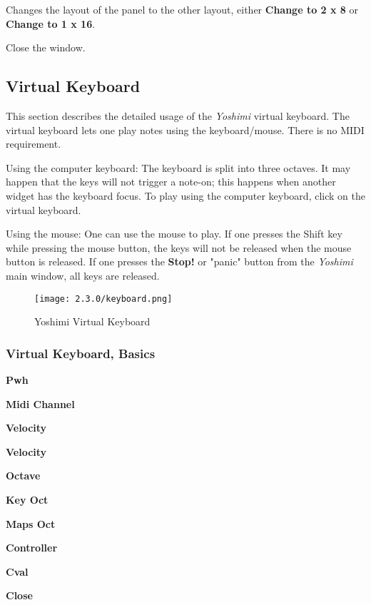    Changes the layout of the panel to the other layout, either
   \textbf{Change to 2 x 8} or
   \textbf{Change to 1 x 16}.

   Close the window.

\subsection{Virtual Keyboard}
\label{subsec:virtual_keyboard}

   This section describes the detailed usage of the
   \textsl{Yoshimi} virtual keyboard.
   The virtual keyboard lets one play notes using the keyboard/mouse. There is
   no MIDI requirement.

   Using the computer keyboard: The keyboard is split into three octaves.
   It may happen that the keys will not trigger a note-on;
   this happens when another widget has the keyboard focus.
   To play using the computer keyboard, click on the virtual keyboard.

   Using the mouse: One can use the mouse to play.  If one presses the
   Shift key while pressing the mouse button, the keys will not be released
   when the mouse button is released.  If one presses the \textbf{Stop!} or
   "panic" button from the \textsl{Yoshimi} main window,
   all keys are released.

\begin{figure}[H]
   \centering
   \texttt{[image: 2.3.0/keyboard.png]}
   \caption{Yoshimi Virtual Keyboard}
   \label{fig:yoshimi_virtual_keyboard}
\end{figure}

\subsubsection{Virtual Keyboard, Basics}
\label{subsubsec:virtual_keyboard_basics}

   \begin{enumber}
      \item \textbf{Pwh}
      \item \textbf{Midi Channel}
      \item \textbf{Velocity}
      \item \textbf{Velocity}
      \item \textbf{Octave}
      \item \textbf{Key Oct}
      \item \textbf{Maps Oct}
      \item \textbf{Controller}
      \item \textbf{Cval}
      \item \textbf{Close}
   \end{enumber}

